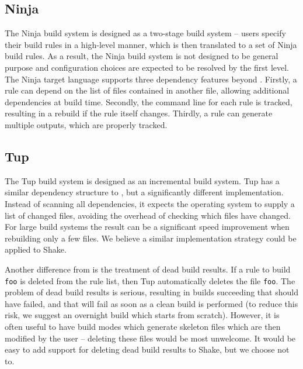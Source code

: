 \subsection{Ninja}


The Ninja build system \cite{ninja} is designed as a two-stage build system -- users specify their build rules in a high-level manner, which is then translated to a set of Ninja build rules. As a result, the Ninja build system is not designed to be general purpose and configuration choices are expected to be resolved by the first level. The Ninja target language supports three dependency features beyond \make{}. Firstly, a rule can depend on the list of files contained in another file, allowing additional dependencies at build time. Secondly, the command line for each rule is tracked, resulting in a rebuild if the rule itself changes. Thirdly, a rule can generate multiple outputs, which are properly tracked.

\subsection{Tup}


The Tup build system \cite{tup} is designed as an incremental build system. Tup has a similar dependency structure to \make{}, but a significantly different implementation. Instead of scanning all dependencies, it expects the operating system to supply a list of changed files, avoiding the overhead of checking which files have changed. For large build systems the result can be a significant speed improvement when rebuilding only a few files. We believe a similar implementation strategy could be applied to Shake.

Another difference from \make{} is the treatment of dead build results. If a rule to build \texttt{foo} is deleted from the rule list, then Tup automatically deletes the file \texttt{foo}. The problem of dead build results is serious, resulting in builds succeeding that should have failed, and that will fail as soon as a clean build is performed (to reduce this risk, we suggest an overnight build which starts from scratch). However, it is often useful to have build modes which generate skeleton files which are then modified by the user -- deleting these files would be most unwelcome. It would be easy to add support for deleting dead build results to Shake, but we choose not to.


